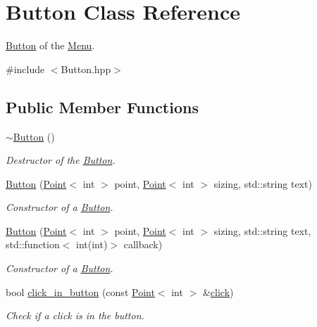 \hypertarget{classButton}{}\section{Button Class Reference}
\label{classButton}


\hyperlink{classButton}{Button} of the \hyperlink{classMenu}{Menu}.  




{\ttfamily \#include $<$Button.\+hpp$>$}

\subsection*{Public Member Functions}
\begin{DoxyCompactItemize}
\item 
\mbox{\label{classButton_a2a001eb9c3cc8ae54768a850dd345002}} 
\hyperlink{classButton_a2a001eb9c3cc8ae54768a850dd345002}{$\sim$\+Button} ()
\begin{DoxyCompactList}\small\item\em Destructor of the \hyperlink{classButton}{Button}. \end{DoxyCompactList}\item 
\hyperlink{classButton_ab418fa07a8ea3f68f8e97e7d1021e0b6}{Button} (\hyperlink{classPoint}{Point}$<$ int $>$ point, \hyperlink{classPoint}{Point}$<$ int $>$ sizing, std\+::string text)
\begin{DoxyCompactList}\small\item\em Constructor of a \hyperlink{classButton}{Button}. \end{DoxyCompactList}\item 
\hyperlink{classButton_a3010396eab6c85e7193e159fccb056f9}{Button} (\hyperlink{classPoint}{Point}$<$ int $>$ point, \hyperlink{classPoint}{Point}$<$ int $>$ sizing, std\+::string text, std\+::function$<$ int(int)$>$ callback)
\begin{DoxyCompactList}\small\item\em Constructor of a \hyperlink{classButton}{Button}. \end{DoxyCompactList}\item 
bool \hyperlink{classButton_acf7ec691fccf7fc66863a6bb24d31ce5}{click\+\_\+in\+\_\+button} (const \hyperlink{classPoint}{Point}$<$ int $>$ \&\hyperlink{classButton_af6a02022f77e1809a90cb6159c1a1536}{click})
\begin{DoxyCompactList}\small\item\em Check if a click is in the button. \end{DoxyCompactList}\item 

\end{DoxyCompactItemize}
